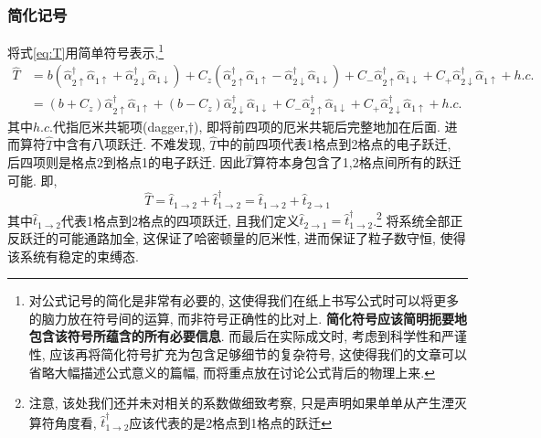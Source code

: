 \documentclass[a4paper, 12pt]{article}
\begin{document}
\subsubsection{简化记号}
将式\eqref{eq:T}用简单符号表示,\footnote{对公式记号的简化是非常有必要的, 这使得我们在纸上书写公式时可以将更多的脑力放在符号间的运算, 而非符号正确性的比对上. \textbf{简化符号应该简明扼要地包含该符号所蕴含的所有必要信息}. 而最后在实际成文时, 考虑到科学性和严谨性, 应该再将简化符号扩充为包含足够细节的复杂符号, 这使得我们的文章可以省略大幅描述公式意义的篇幅, 而将重点放在讨论公式背后的物理上来.
}
\begin{equation}
  \label{eq:Tsimple}
  \begin{aligned}
    \widehat{T} &= b\left(\widehat{\alpha}_{2\uparrow}^{\dagger}\widehat{\alpha}_{1\uparrow} + \widehat{\alpha}_{2\downarrow}^{\dagger}\widehat{\alpha}_{1\downarrow}\right) + C_{z}\left(\widehat{\alpha}_{2\uparrow}^{\dagger}\widehat{\alpha}_{1\uparrow} - \widehat{\alpha}_{2\downarrow}^{\dagger}\widehat{\alpha}_{1\downarrow}\right) + C_{-}\widehat{\alpha}_{2\uparrow}^{\dagger}\widehat{\alpha}_{1\downarrow} + C_{+}\widehat{\alpha}_{2\downarrow}^{\dagger}\widehat{\alpha}_{1\uparrow} + h.c.\\
    &= (b+C_z)\widehat{\alpha}_{2\uparrow}^{\dagger}\widehat{\alpha}_{1\uparrow} + (b-C_z)\widehat{\alpha}_{2\downarrow}^{\dagger}\widehat{\alpha}_{1\downarrow} + C_{-}\widehat{\alpha}_{2\uparrow}^{\dagger}\widehat{\alpha}_{1\downarrow} + C_{+}\widehat{\alpha}_{2\downarrow}^{\dagger}\widehat{\alpha}_{1\uparrow} + h.c.
  \end{aligned}
\end{equation}
其中\(h.c.\)代指厄米共轭项(dagger,\(\dagger\)), 即将前四项的厄米共轭后完整地加在后面. 进而算符\(\widehat{T}\)中含有八项跃迁. 不难发现, \(\widehat{T}\)中的前四项代表1格点到2格点的电子跃迁, 后四项则是格点2到格点1的电子跃迁. 因此\(\widehat{T}\)算符本身包含了1,2格点间所有的跃迁可能. 即, 
\begin{equation}
  \label{eq:tdagger}
  \widehat{T} = \widehat{t}_{1\to{}2} + \widehat{t}_{1\to{}2}^\dagger = \widehat{t}_{1\to{}2} + \widehat{t}_{2\to{}1}
\end{equation}
其中\(\widehat{t}_{1\to{}2}\)代表1格点到2格点的四项跃迁, 且我们定义\(\widehat{t}_{2\to{}1} = \widehat{t}_{1\to{}2}^\dagger\).\footnote{注意, 该处我们还并未对相关的系数做细致考察, 只是声明如果单单从产生湮灭算符角度看, \(\widehat{t}_{1\to{}2}^\dagger\)应该代表的是2格点到1格点的跃迁} 将系统全部正反跃迁的可能通路加全, 这保证了哈密顿量的厄米性, 进而保证了粒子数守恒, 使得该系统有稳定的束缚态.
\end{document}
